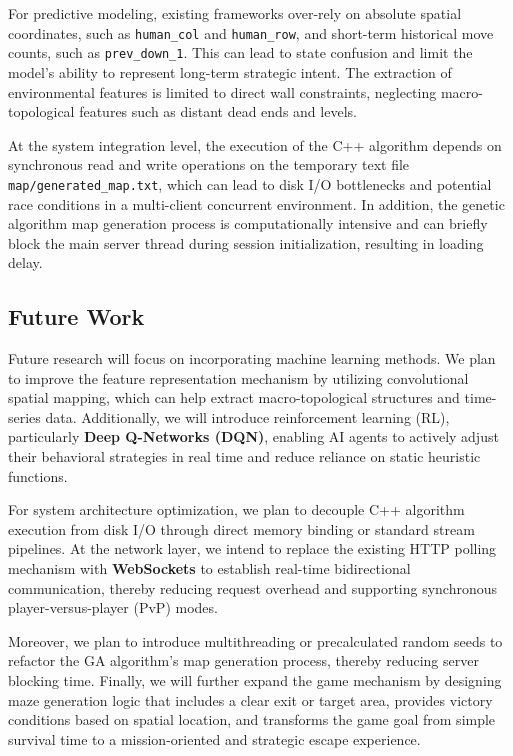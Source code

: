 \documentclass[12pt,a4paper]{article}
\begin{document}
For predictive modeling, existing frameworks over-rely on absolute spatial coordinates, such as \texttt{human\_col} and \texttt{human\_row}, and short-term historical move counts, such as \texttt{prev\_down\_1}. This can lead to state confusion and limit the model's ability to represent long-term strategic intent. The extraction of environmental features is limited to direct wall constraints, neglecting macro-topological features such as distant dead ends and levels.

At the system integration level, the execution of the C++ algorithm depends on synchronous read and write operations on the temporary text file \texttt{map/generated\_map.txt}, which can lead to disk I/O bottlenecks and potential race conditions in a multi-client concurrent environment. In addition, the genetic algorithm map generation process is computationally intensive and can briefly block the main server thread during session initialization, resulting in loading delay.

\subsection{Future Work}

Future research will focus on incorporating machine learning methods. We plan to improve the feature representation mechanism by utilizing convolutional spatial mapping, which can help extract macro-topological structures and time-series data. Additionally, we will introduce reinforcement learning (RL), particularly \textbf{Deep Q-Networks (DQN)}, enabling AI agents to actively adjust their behavioral strategies in real time and reduce reliance on static heuristic functions.

For system architecture optimization, we plan to decouple C++ algorithm execution from disk I/O through direct memory binding or standard stream pipelines. At the network layer, we intend to replace the existing HTTP polling mechanism with \textbf{WebSockets} to establish real-time bidirectional communication, thereby reducing request overhead and supporting synchronous player-versus-player (PvP) modes.

Moreover, we plan to introduce multithreading or precalculated random seeds to refactor the GA algorithm's map generation process, thereby reducing server blocking time. Finally, we will further expand the game mechanism by designing maze generation logic that includes a clear exit or target area, provides victory conditions based on spatial location, and transforms the game goal from simple survival time to a mission-oriented and strategic escape experience.
\end{document}
